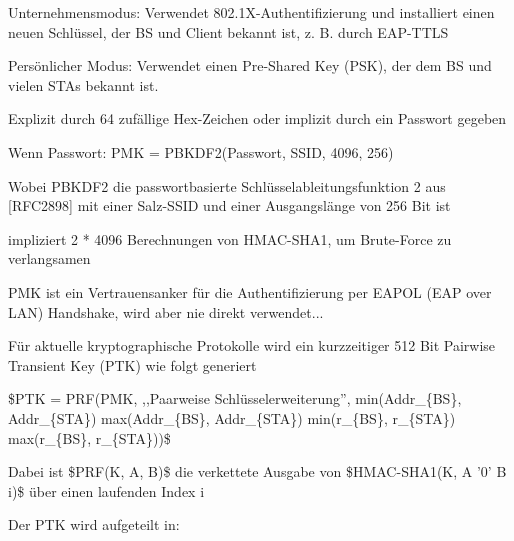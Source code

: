 \documentclass[a4paper]{article}
\begin{document}
\begin{multicols}{3}
\begin{itemize*}
            \begin{itemize*}
                  \item Unternehmensmodus: Verwendet 802.1X-Authentifizierung und installiert einen neuen Schlüssel, der BS und Client bekannt ist, z. B. durch EAP-TTLS
                  \item Persönlicher Modus: Verwendet einen Pre-Shared Key (PSK), der dem BS und vielen STAs bekannt ist.
                  \begin{itemize*} \item Explizit durch 64 zufällige Hex-Zeichen oder implizit durch ein Passwort gegeben \item Wenn Passwort: PMK = PBKDF2(Passwort, SSID, 4096, 256) \item Wobei PBKDF2 die passwortbasierte Schlüsselableitungsfunktion 2 aus {[}RFC2898{]} mit einer Salz-SSID und einer Ausgangslänge von 256 Bit ist \item impliziert 2 * 4096 Berechnungen von HMAC-SHA1, um Brute-Force zu verlangsamen \end{itemize*}
            \end{itemize*}
            \item
            PMK ist ein Vertrauensanker für die Authentifizierung per EAPOL (EAP
            over LAN) Handshake, wird aber nie direkt verwendet...
            \item
            Für aktuelle kryptographische Protokolle wird ein kurzzeitiger 512 Bit
            Pairwise Transient Key (PTK) wie folgt generiert

            \begin{itemize*}
                  \item \$PTK = PRF(PMK, ,,Paarweise Schlüsselerweiterung'', min(Addr\_\{BS\}, Addr\_\{STA\}) \textbar\textbar{} max(Addr\_\{BS\}, Addr\_\{STA\}) \textbar\textbar{} min(r\_\{BS\}, r\_\{STA\}) \textbar\textbar{} max(r\_\{BS\}, r\_\{STA\}))\$
                  \item Dabei ist \$PRF(K, A, B)\$ die verkettete Ausgabe von \$HMAC-SHA1(K, A \textbar\textbar{} '0' \textbar\textbar{} B \textbar\textbar{} i)\$ über einen laufenden Index i
            \end{itemize*}
            \item
            Der PTK wird aufgeteilt in:


\end{itemize*}
\end{multicols}
\end{document}
